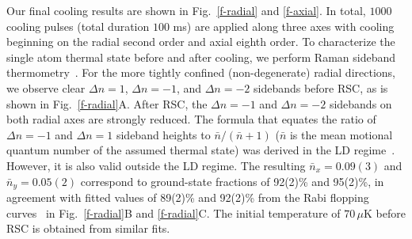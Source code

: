 \documentclass[aps,prl,twocolumn,groupedaddress]{revtex4-1}
\begin{document}
Our final cooling results are shown in Fig.~\ref{f-radial} and \ref{f-axial}.
In total, $1000$ cooling pulses (total duration $100$ ms) are applied
along three axes with cooling beginning on the radial second order and axial eighth order.
To characterize the single atom thermal state before and after cooling,
we perform Raman sideband thermometry~\cite{Monroe1995, Meekhof1996}.
For the more tightly confined (non-degenerate) radial directions,
we observe clear $\Delta n=1$, $\Delta n=-1$, and $\Delta n=-2$ sidebands before RSC, as is shown in Fig.~\ref{f-radial}A.
After RSC, the $\Delta n=-1$ and $\Delta n=-2$ sidebands on both radial axes are strongly reduced.
The formula that equates the ratio of $\Delta n=-1$ and $\Delta n=1$ sideband heights to $\bar{n}/(\bar{n}+1)$ ($\bar{n}$ is the mean motional quantum number of the assumed thermal state) was derived in the LD regime~\cite{Monroe1995}. However, it is also valid outside the LD regime.  The resulting $\bar{n}_x=0.09(3)$ and $\bar{n}_y=0.05(2)$ correspond to ground-state fractions of 92(2)\% and 95(2)\%,  in agreement with fitted values of 89(2)\% and 92(2)\% from the Rabi flopping curves~ \cite{Meekhof1996} in Fig.~\ref{f-radial}B and \ref{f-radial}C.
The initial temperature of $70\,\mu$K before RSC is obtained
from similar fits. %
\end{document}
